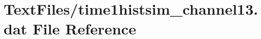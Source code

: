 \hypertarget{TextFiles_2time1histsim__channel13_8dat}{}\section{Text\+Files/time1histsim\+\_\+channel13.dat File Reference}
\label{TextFiles_2time1histsim__channel13_8dat}
